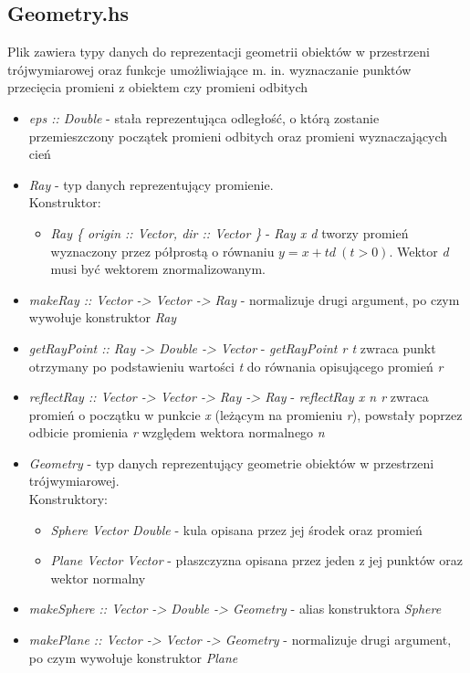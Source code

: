 \documentclass[11pt,a4paper]{article}
\begin{document}
\subsection{Geometry.hs}
Plik zawiera typy danych do reprezentacji geometrii obiektów w przestrzeni trójwymiarowej oraz funkcje umożliwiające m. in. wyznaczanie punktów przecięcia promieni z obiektem czy promieni odbitych
\begin{itemize}
\item\textit{eps :: Double} - stała reprezentująca odległość, o którą zostanie przemieszczony początek promieni odbitych oraz promieni wyznaczających cień
\item\textit{Ray} - typ danych reprezentujący promienie.\\Konstruktor:
\begin{itemize}
\item\textit{Ray \{ origin :: Vector, dir :: Vector \}} - \textit{Ray x d} tworzy promień wyznaczony przez półprostą o równaniu $y = x + td\ (t > 0)$. Wektor \textit{d} musi być wektorem znormalizowanym.
\end{itemize}
\item\textit{makeRay :: Vector -> Vector -> Ray} - normalizuje drugi argument, po czym wywołuje konstruktor \textit{Ray}
\item\textit{getRayPoint :: Ray -> Double -> Vector} - \textit{getRayPoint r t} zwraca punkt otrzymany po podstawieniu wartości \textit{t} do równania opisującego promień \textit{r}
\item\textit{reflectRay :: Vector -> Vector -> Ray -> Ray} - \textit{reflectRay x n r} zwraca promień o początku w punkcie \textit{x} (leżącym na promieniu \textit{r}), powstały poprzez odbicie promienia \textit{r} względem wektora normalnego \textit{n}
\item\textit{Geometry} - typ danych reprezentujący geometrie obiektów w przestrzeni trójwymiarowej.\\Konstruktory:
\begin{itemize}
\item\textit{Sphere Vector Double} - kula opisana przez jej środek oraz promień
\item\textit{Plane Vector Vector} - płaszczyzna opisana przez jeden z jej punktów oraz wektor normalny
\end{itemize}
\item\textit{makeSphere :: Vector -> Double -> Geometry} - alias konstruktora \textit{Sphere}
\item\textit{makePlane :: Vector -> Vector -> Geometry} - normalizuje drugi argument, po czym wywołuje konstruktor \textit{Plane}

\end{itemize}
\end{document}
